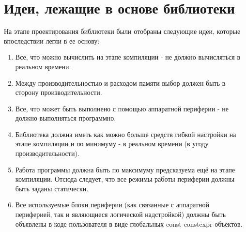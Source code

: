 \section{Идеи, лежащие в основе библиотеки}На этапе проектирования библиотеки были отобраны следующие идеи, которые впоследствии легли в ее основу:
\begin{enumerate}
	\item Все, что можно вычислить на этапе компиляции - не должно вычисляться в реальном времени. 
	\item Между производительностью и расходом памяти выбор должен быть в сторону производительности.
	\item Все, что может быть выполнено с помощью аппаратной периферии - не должно выполняться программно.
	\item Библиотека должна иметь как можно больше средств гибкой настройки на этапе компиляции и по минимуму - в реальном времени (в угоду производительности).
	\item Работа программы должна быть по максимуму предсказуема ещё на этапе компиляции. Отсюда следует, что все режимы работы периферии должны быть заданы статически.
	\item Все используемые блоки периферии (как связанные с аппаратной периферией, так и являющиеся логической надстройкой) должны быть объявлены в коде пользователя в виде глобальных const constexpr объектов.
\end{enumerate}